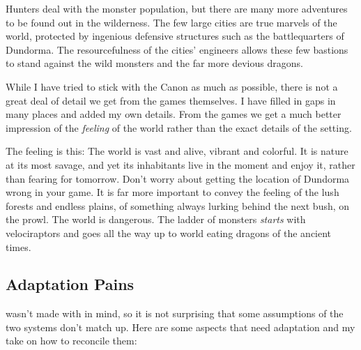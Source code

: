 Hunters deal with the monster population, but there are many more adventures to be found out in the wilderness. The few large cities are true marvels of the world, protected by ingenious defensive structures such as the battlequarters of Dundorma. The resourcefulness of the cities' engineers allows these few bastions to stand against the wild monsters and the far more devious dragons.

While I have tried to stick with the \MH{} Canon as much as possible, there is not a great deal of detail we get from the games themselves. I have filled in gaps in many places and added my own details. From the games we get a much better impression of the \emph{feeling} of the world rather than the exact details of the setting.

The feeling is this: The world is vast and alive, vibrant and colorful. It is nature at its most savage, and yet its inhabitants live in the moment and enjoy it, rather than fearing for tomorrow. Don't worry about getting the location of Dundorma wrong in your game. It is far more important to convey the feeling of the lush forests and endless plains, of something always lurking behind the next bush, on the prowl. The world is dangerous. The ladder of monsters \emph{starts} with velociraptors and goes all the way up to world eating dragons of the ancient times.

\subsection{Adaptation Pains}
\MH{} wasn't made with \DND{} in mind, so it is not surprising that some assumptions of the two systems don't match up. Here are some aspects that need adaptation and my take on how to reconcile them:

